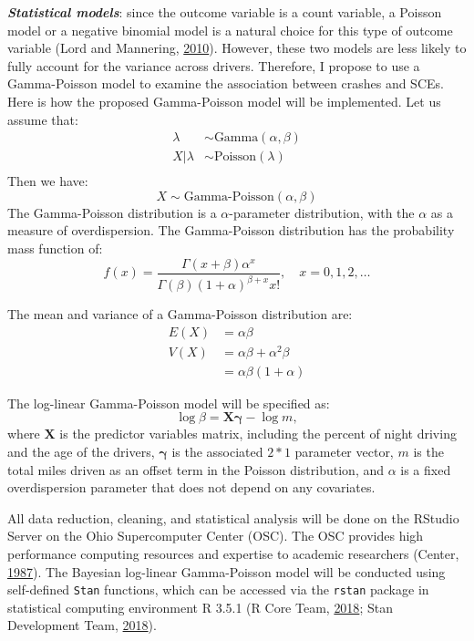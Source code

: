 \documentclass[12pt]{book}
\numberwithin{equation}{chapter}
\begin{document}
\textbf{\emph{Statistical models}}: since the outcome variable is a count variable, a Poisson model or a negative binomial model is a natural choice for this type of outcome variable (Lord and Mannering, \protect\hyperlink{ref-lord2010statistical}{2010}). However, these two models are less likely to fully account for the variance across drivers. Therefore, I propose to use a Gamma-Poisson model to examine the association between crashes and SCEs. Here is how the proposed Gamma-Poisson model will be implemented. Let us assume that:
\[
\begin{aligned}
\lambda & \sim \text{Gamma}(\alpha, \beta)\\
X|\lambda & \sim \text{Poisson}(\lambda)\\
\end{aligned}
\]
Then we have:
\[X \sim \text{Gamma-Poisson}(\alpha, \beta)\]
The Gamma-Poisson distribution is a \(\alpha\)-parameter distribution, with the \(\alpha\) as a measure of overdispersion. The Gamma-Poisson distribution has the probability mass function of:
\[f(x) = \frac{\Gamma(x + \beta)\alpha^x}{\Gamma(\beta)(1 + \alpha)^{\beta + x}x!}, \quad x = 0, 1, 2, \dots\]

The mean and variance of a Gamma-Poisson distribution are:
\[
\begin{aligned}
E(X) & = \alpha\beta \\
V(X) & = \alpha\beta + \alpha^2\beta\\
     & = \alpha\beta(1 + \alpha)
\end{aligned}
\]

The log-linear Gamma-Poisson model will be specified as:
\[
\log\beta = \mathbf{X\gamma} - \log m,
\]
where \(\mathbf{X}\) is the predictor variables matrix, including the percent of night driving and the age of the drivers, \(\mathbf{\gamma}\) is the associated \(2*1\) parameter vector, \(m\) is the total miles driven as an offset term in the Poisson distribution, and \(\alpha\) is a fixed overdispersion parameter that does not depend on any covariates.

All data reduction, cleaning, and statistical analysis will be done on the RStudio Server on the Ohio Supercomputer Center (OSC). The OSC provides high performance computing resources and expertise to academic researchers (Center, \protect\hyperlink{ref-OSC1987}{1987}). The Bayesian log-linear Gamma-Poisson model will be conducted using self-defined \texttt{Stan} functions, which can be accessed via the \texttt{rstan} package in statistical computing environment R 3.5.1 (R Core Team, \protect\hyperlink{ref-Rcitation}{2018}; Stan Development Team, \protect\hyperlink{ref-rstancitation}{2018}).
\end{document}
